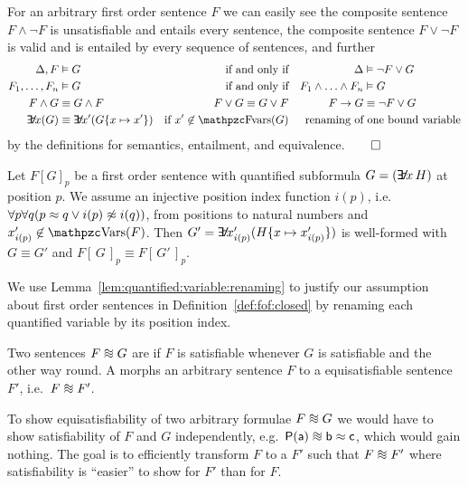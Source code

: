 \begin{example}
	For an arbitrary first order sentence \( F \)
	we can easily see the composite sentence \( F\land\lnot F \)
	is unsatisfiable and entails every sentence,
	the composite sentence \( F\lor\lnot F \) is valid and is entailed by every sequence of sentences, and further
	\begin{align*}
	\Delta, F&\entails G  &\text{if and only if} && \Delta &\entails \lnot F\lor G
	\\
	F_1,\ldots,F_n&\entails G  &\text{if and only if} && F_1\land\ldots\land F_n&\entails G
	\\
	F\land G&\equival G\land F &F\lor G\equival G\lor F && F\limp G &\equival \lnot F\lor G
	\\
	\quantify x (G) &\equiv \quantify x' (G \{x\mapsto x'\} )
	&\text{if } x' \not\in\fvar(G)
	&&\text{renaming of} &\text{ one bound variable}
	\end{align*}
	by the definitions for semantics, entailment, and equivalence.\hfill \( \qed \)
\end{example}

\begin{lemma}\label{lem:quantified:variable:renaming}
	Let \( {F[G]}_p \)
	be a first order sentence with quantified subformula
	\( G = (\quantify x\,H) \) at position \( p \).
	We assume an injective position index function \( i(p) \),
	i.e.~\( \forall p \forall q (p \approx q \lor i(p) \not\approx i(q)  ) \),
	from positions to natural numbers
	and \( x'_{i(p)} \not\in\var(F) \).
	Then \( G' = \quantify x'_{i(p)} (H\{x\mapsto x'_{i(p)}\}) \)
	is well-formed with
	\( G \equiv G' \) and
	\(
		{F[\,G\,]}_p
		\equiv
		{F[\,G'\,]}_p
	\).
\end{lemma}

\noindent We use Lemma~\ref{lem:quantified:variable:renaming}
to justify our assumption about first order sentences
in Definition~\vref{def:fof:closed} by renaming each
quantified variable by its position index.

\begin{definition}\label{def:equisatisfiable}
	Two sentences \( F \equisat G \) are 
	if \( F \) is satisfiable whenever \( G \) is satisfiable
	and the other way round.
	A  morphs an arbitrary sentence
	\( F \) to a equisatisfiable sentence \( F' \), i.e.~\( F \equisat F' \).
\end{definition}

\begin{remark}
	To show equisatisfiability of two arbitrary formulae \( F \equisat G \) 
	we would have to show satisfiability of \( F \) and \( G \) independently,
	e.g.~\(\mP(\ma) \equisat \mb\mEQ\mc \), 
	which would gain nothing. %
	The goal is to efficiently transform \( F \) to a \( F' \) 
	such that \( F \equisat F' \)
	where satisfiability is “easier”
	to show for \( F' \) than for \( F \).
\end{remark}

